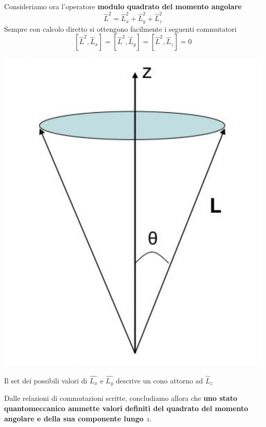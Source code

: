 Consideriamo ora l'operatore \textbf{modulo quadrato del momento
angolare} \[
              \hat{L}^{2} = \hat{L}_{x}^{2} + \hat{L}_{y}^{2} + \hat{L}_{z}^{2}
\] Sempre con calcolo diretto si ottengono facilmente i seguenti
commutatori \[
                \left[ \hat{L}^{2},\hat{L}_{x}\right] = \left[ \hat{L}^{2},\hat{L}_{y}\right] = \left[ \hat{L}^{2},\hat{L}_{z}\right] = 0
\]
\begin{marginfigure}
    \includegraphics{figs/ang-mom-cone}
    \caption{Il set dei possibili valori di $\hat{L_x}$ e $\hat{L_y}$ descrive un cono attorno ad $\hat{L}_z$}
    \label{fig:ang-mom-cone}
\end{marginfigure}


Dalle relazioni di commutazioni scritte, concludiamo allora che
\textbf{uno stato quantomeccanico ammette valori definiti del quadrato
del momento angolare e della sua componente lungo \(z\)}.

